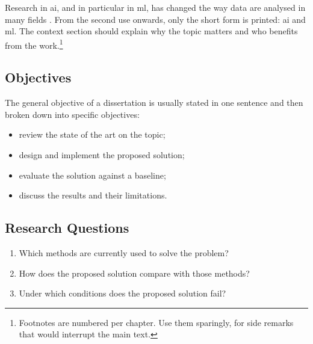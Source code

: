Research in \gls{ai}, and in particular in \gls{ml}, has changed the way
data are analysed in many fields \cite{LeCun2015}. From the second use
onwards, only the short form is printed: \gls{ai} and \gls{ml}.
The context section should explain why the topic matters and who benefits
from the work.\footnote{Footnotes are numbered per chapter. Use them sparingly,
for side remarks that would interrupt the main text.}

\subsection{Objectives}
\label{sec:intro:objectives}

The general objective of a dissertation is usually stated in one sentence and
then broken down into specific objectives:

\begin{itemize}
  \item review the state of the art on the topic;
  \item design and implement the proposed solution;
  \item evaluate the solution against a baseline;
  \item discuss the results and their limitations.
\end{itemize}

\subsection{Research Questions}
\label{sec:intro:questions}

\begin{enumerate}[label=\textbf{RQ\arabic*.}, leftmargin=*]
  \item Which methods are currently used to solve the problem?
  \item How does the proposed solution compare with those methods?
  \item Under which conditions does the proposed solution fail?
\end{enumerate}

